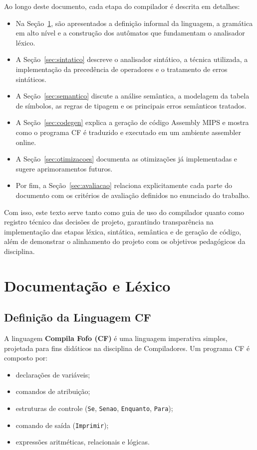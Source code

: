 \documentclass[12pt,a4paper]{article}
\begin{document}
Ao longo deste documento, cada etapa do compilador é descrita em detalhes:

\begin{itemize}
  \item Na Seção~\ref{sec:lexico}, são apresentados a definição informal da linguagem, a gramática em alto nível e a construção dos autômatos que fundamentam o analisador léxico.
  \item A Seção~\ref{sec:sintatico} descreve o analisador sintático, a técnica utilizada, a implementação da precedência de operadores e o tratamento de erros sintáticos.
  \item A Seção~\ref{sec:semantico} discute a análise semântica, a modelagem da tabela de símbolos, as regras de tipagem e os principais erros semânticos tratados.
  \item A Seção~\ref{sec:codegen} explica a geração de código Assembly MIPS e mostra como o programa CF é traduzido e executado em um ambiente assembler online.
  \item A Seção~\ref{sec:otimizacoes} documenta as otimizações já implementadas e sugere aprimoramentos futuros.
  \item Por fim, a Seção~\ref{sec:avaliacao} relaciona explicitamente cada parte do documento com os critérios de avaliação definidos no enunciado do trabalho.
\end{itemize}

Com isso, este texto serve tanto como guia de uso do compilador quanto como registro técnico das decisões de projeto, garantindo transparência na implementação das etapas léxica, sintática, semântica e de geração de código, além de demonstrar o alinhamento do projeto com os objetivos pedagógicos da disciplina.

\section{Documentação e Léxico}
\label{sec:lexico}

\subsection{Definição da Linguagem CF}

A linguagem \textbf{Compila Fofo (CF)} é uma linguagem imperativa simples, projetada para fins didáticos na disciplina de Compiladores. Um programa CF é composto por:

\begin{itemize}
  \item declarações de variáveis;
  \item comandos de atribuição;
  \item estruturas de controle (\texttt{Se}, \texttt{Senao}, \texttt{Enquanto}, \texttt{Para});
  \item comando de saída (\texttt{Imprimir});
  \item expressões aritméticas, relacionais e lógicas.
\end{itemize}
\end{document}
